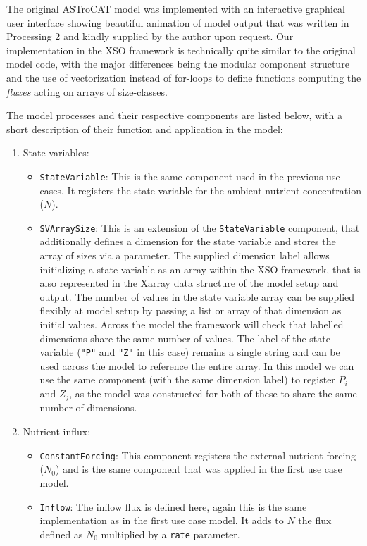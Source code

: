 \documentclass[journal abbreviation, manuscript]{copernicus}
\begin{document}
The original ASTroCAT model was implemented with an interactive graphical user interface showing beautiful animation of model output that was written in Processing 2 and kindly supplied by the author upon request. Our implementation in the XSO framework is technically quite similar to the original model code, with the major differences being the modular component structure and the use of vectorization instead of for-loops to define functions computing the \textit{fluxes} acting on arrays of size-classes.

The model processes and their respective components are listed below, with a short description of their function and application in the model:

\begin{enumerate}
    \item State variables: 
    \begin{itemize}
        \item \texttt{StateVariable}: This is the same component used in the previous use cases. It registers the state variable for the ambient nutrient concentration ($N$). 
        \item \texttt{SVArraySize}: This is an extension of the \texttt{StateVariable} component, that additionally defines a dimension for the state variable and stores the array of sizes via a parameter. The supplied dimension label allows initializing a state variable as an array within the XSO framework, that is also represented in the Xarray data structure of the model setup and output. The number of values in the state variable array can be supplied flexibly at model setup by passing a list or array of that dimension as initial values. Across the model the framework will check that labelled dimensions share the same number of values. The label of the state variable (\texttt{"P"} and \texttt{"Z"} in this case) remains a single string and can be used across the model to reference the entire array. In this model we can use the same component (with the same dimension label) to register $P_i$ and $Z_j$, as the model was constructed for both of these to share the same number of dimensions.
    \end{itemize}

    \item Nutrient influx: 
    \begin{itemize}
        \item \texttt{ConstantForcing}: This component registers the external nutrient forcing ($N_0$) and is the same component that was applied in the first use case model.
        \item \texttt{Inflow}: The inflow flux is defined here, again this is the same implementation as in the first use case model. It adds to $N$ the flux defined as $N_0$ multiplied by a \texttt{rate} parameter. 
    \end{itemize}
    

\end{enumerate}
\end{document}
